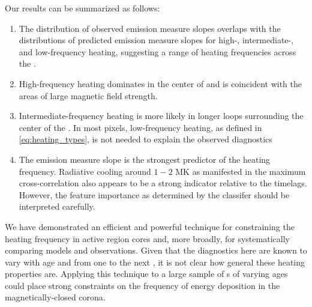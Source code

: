 Our results can be summarized as follows:
\begin{enumerate}
    \item The distribution of observed emission measure slopes overlaps with the distributions of predicted emission measure slopes for high-, intermediate-, and low-frequency heating, suggesting a range of heating frequencies across the \AR{}.
    \item High-frequency heating dominates in the center of \AR{} and is coincident with the areas of large magnetic field strength.
    \item Intermediate-frequency heating is more likely in longer loops surrounding the center of the \AR{}. In most pixels, low-frequency heating, as defined in \autoref{eq:heating_types}, is not needed to explain the observed diagnostics
    \item The emission measure slope is the strongest predictor of the heating frequency. Radiative cooling around $1-2$ MK as manifested in the maximum cross-correlation also appears to be a strong indicator relative to the timelags. However, the feature importance as determined by the classifer should be interpreted carefully.
\end{enumerate}

We have demonstrated an efficient and powerful technique for constraining the heating frequency in active region cores and, more broadly, for systematically comparing models and observations. Given that the diagnostics here are known to vary with age \citep[e.g.][]{schmelz_cold_2012,del_zanna_evolution_2015} and from one \AR{} to the next \citep{warren_systematic_2012,viall_survey_2017}, it is not clear how general these heating properties are. Applying this technique to a large sample of \AR s of varying ages could place strong constraints on the frequency of energy deposition in the magnetically-closed corona. 
